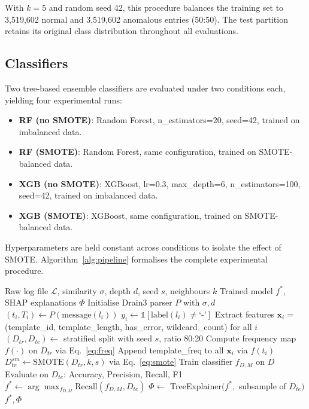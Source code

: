 \documentclass[conference]{IEEEtran}
\begin{document}
With $k = 5$ and random seed 42, this procedure balances the training set
to 3{,}519{,}602 normal and 3{,}519{,}602 anomalous entries (50:50). The
test partition retains its original class distribution throughout all
evaluations.

\subsection{Classifiers}

Two tree-based ensemble classifiers are evaluated under two conditions
each, yielding four experimental runs:

\begin{itemize}
  \item \textbf{RF (no SMOTE)}: Random Forest, n\_estimators=20, seed=42,
        trained on imbalanced data.
  \item \textbf{RF (SMOTE)}: Random Forest, same configuration, trained on
        SMOTE-balanced data.
  \item \textbf{XGB (no SMOTE)}: XGBoost, lr=0.3, max\_depth=6,
        n\_estimators=100, seed=42, trained on imbalanced data.
  \item \textbf{XGB (SMOTE)}: XGBoost, same configuration, trained on
        SMOTE-balanced data.
\end{itemize}

Hyperparameters are held constant across conditions to isolate the effect
of SMOTE. Algorithm~\ref{alg:pipeline} formalises the complete experimental
procedure.

\begin{algorithm}[t]
\caption{Explainable IoT Log Anomaly Detection}
\label{alg:pipeline}
\begin{algorithmic}[1]
\Require Raw log file $\mathcal{L}$, similarity $\sigma$, depth $d$,
         seed $s$, neighbours $k$
\Ensure Trained model $f^*$, SHAP explanations $\Phi$
\State Initialise Drain3 parser $P$ with $\sigma, d$
  \State $(t_i, T_i) \gets P(\text{message}(l_i))$
  \State $y_i \gets \mathbb{1}[\text{label}(l_i) \neq \text{`-'}]$
\EndFor
\State Extract features $\mathbf{x}_i = $ (template\_id, template\_length,
        has\_error, wildcard\_count) for all $i$
\State $(D_{tr}, D_{te}) \gets$ stratified split with seed $s$, ratio 80:20
\State Compute frequency map $f(\cdot)$ on $D_{tr}$ via Eq.~\ref{eq:freq}
\State Append template\_freq to all $\mathbf{x}_i$ via $f(t_i)$
\State $D_{tr}^{sm} \gets \text{SMOTE}(D_{tr}, k, s)$ via Eq.~\ref{eq:smote}
  \State Train classifier $f_{D,M}$ on $D$
  \State Evaluate on $D_{te}$: Accuracy, Precision, Recall, F1
\EndFor
\State $f^* \gets \arg\max_{f_{D,M}} \text{Recall}(f_{D,M}, D_{te})$
\State $\Phi \gets$ TreeExplainer$(f^*, $ subsample of $D_{te})$
\State \Return $f^*, \Phi$
\end{algorithmic}
\end{algorithm}
\end{document}
